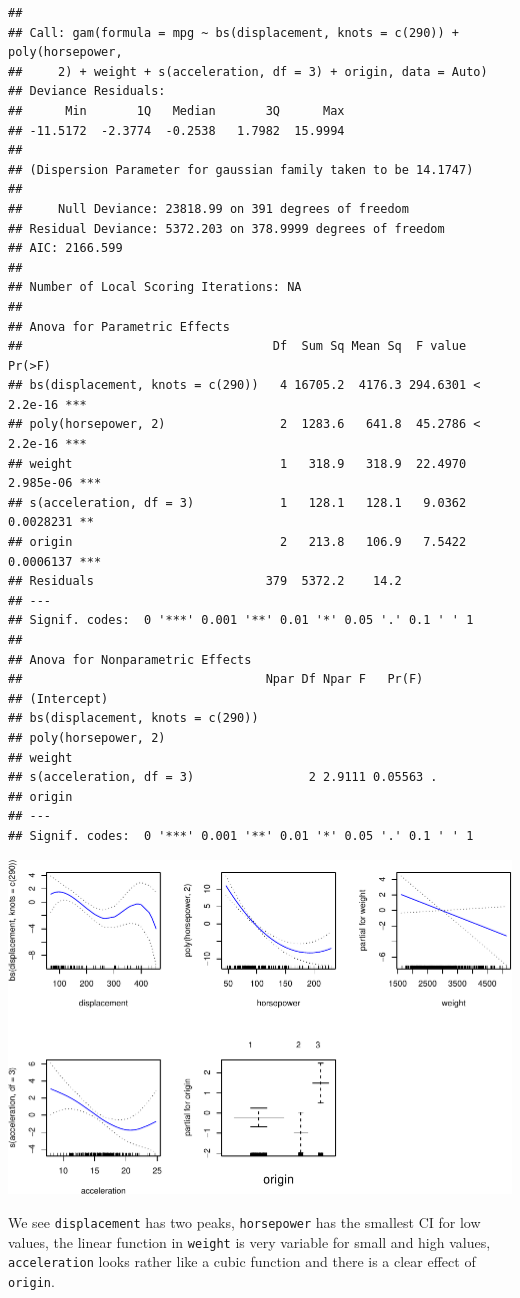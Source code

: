 \documentclass[
]{article}
\begin{document}
\begin{verbatim}
## 
## Call: gam(formula = mpg ~ bs(displacement, knots = c(290)) + poly(horsepower, 
##     2) + weight + s(acceleration, df = 3) + origin, data = Auto)
## Deviance Residuals:
##      Min       1Q   Median       3Q      Max 
## -11.5172  -2.3774  -0.2538   1.7982  15.9994 
## 
## (Dispersion Parameter for gaussian family taken to be 14.1747)
## 
##     Null Deviance: 23818.99 on 391 degrees of freedom
## Residual Deviance: 5372.203 on 378.9999 degrees of freedom
## AIC: 2166.599 
## 
## Number of Local Scoring Iterations: NA 
## 
## Anova for Parametric Effects
##                                   Df  Sum Sq Mean Sq  F value    Pr(>F)    
## bs(displacement, knots = c(290))   4 16705.2  4176.3 294.6301 < 2.2e-16 ***
## poly(horsepower, 2)                2  1283.6   641.8  45.2786 < 2.2e-16 ***
## weight                             1   318.9   318.9  22.4970 2.985e-06 ***
## s(acceleration, df = 3)            1   128.1   128.1   9.0362 0.0028231 ** 
## origin                             2   213.8   106.9   7.5422 0.0006137 ***
## Residuals                        379  5372.2    14.2                       
## ---
## Signif. codes:  0 '***' 0.001 '**' 0.01 '*' 0.05 '.' 0.1 ' ' 1
## 
## Anova for Nonparametric Effects
##                                  Npar Df Npar F   Pr(F)  
## (Intercept)                                              
## bs(displacement, knots = c(290))                         
## poly(horsepower, 2)                                      
## weight                                                   
## s(acceleration, df = 3)                2 2.9111 0.05563 .
## origin                                                   
## ---
## Signif. codes:  0 '***' 0.001 '**' 0.01 '*' 0.05 '.' 0.1 ' ' 1
\end{verbatim}

\includegraphics{RecEx7-sol_files/figure-latex/unnamed-chunk-7-1.pdf}

We see \texttt{displacement} has two peaks, \texttt{horsepower} has the
smallest CI for low values, the linear function in \texttt{weight} is
very variable for small and high values, \texttt{acceleration} looks
rather like a cubic function and there is a clear effect of
\texttt{origin}.
\end{document}
